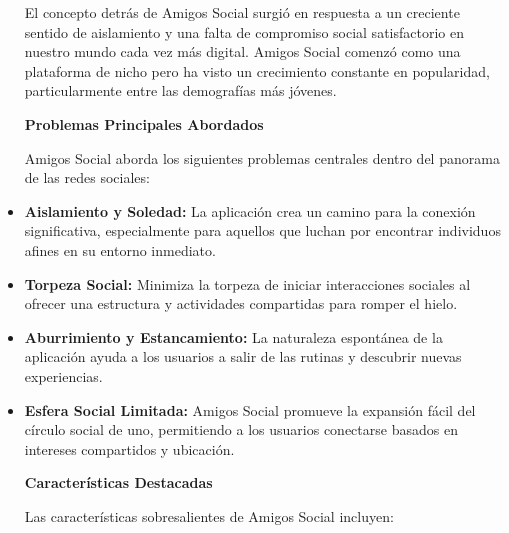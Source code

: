 \begin{itemize}
El concepto detrás de Amigos Social surgió en respuesta a un creciente sentido de aislamiento y una falta de compromiso social 
satisfactorio en nuestro mundo cada vez más digital. Amigos Social comenzó como una plataforma de nicho pero ha visto un crecimiento constante en popularidad, particularmente entre las demografías más jóvenes.


\textbf{Problemas Principales Abordados}

Amigos Social aborda los siguientes problemas centrales dentro del panorama de las redes sociales:

\item \textbf{Aislamiento y Soledad:} La aplicación crea un camino para la conexión significativa, especialmente para aquellos que luchan por encontrar individuos afines en su entorno inmediato.
\item \textbf{Torpeza Social:} Minimiza la torpeza de iniciar interacciones sociales al ofrecer una estructura y actividades compartidas para romper el hielo.
\item \textbf{Aburrimiento y Estancamiento:} La naturaleza espontánea de la aplicación ayuda a los usuarios a salir de las rutinas y descubrir nuevas experiencias.
\item \textbf{Esfera Social Limitada:} Amigos Social promueve la expansión fácil del círculo social de uno, permitiendo a los usuarios conectarse basados en intereses compartidos y ubicación.

\textbf{Características Destacadas}

Las características sobresalientes de Amigos Social incluyen:


\end{itemize}
